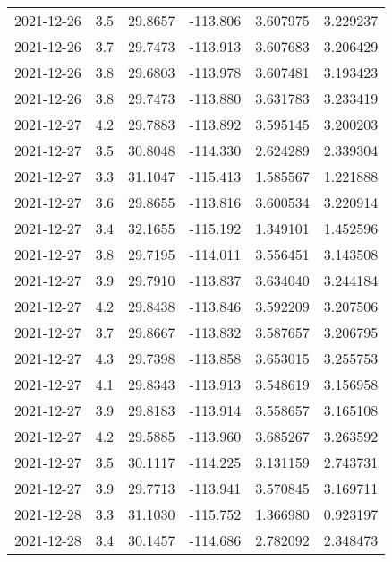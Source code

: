\begin{tabular}{lrrrrr}
2021-12-26 &       3.5 &  29.8657 &  -113.806 &         3.607975 &         3.229237 \\
2021-12-26 &       3.7 &  29.7473 &  -113.913 &         3.607683 &         3.206429 \\
2021-12-26 &       3.8 &  29.6803 &  -113.978 &         3.607481 &         3.193423 \\
2021-12-26 &       3.8 &  29.7473 &  -113.880 &         3.631783 &         3.233419 \\
2021-12-27 &       4.2 &  29.7883 &  -113.892 &         3.595145 &         3.200203 \\
2021-12-27 &       3.5 &  30.8048 &  -114.330 &         2.624289 &         2.339304 \\
2021-12-27 &       3.3 &  31.1047 &  -115.413 &         1.585567 &         1.221888 \\
2021-12-27 &       3.6 &  29.8655 &  -113.816 &         3.600534 &         3.220914 \\
2021-12-27 &       3.4 &  32.1655 &  -115.192 &         1.349101 &         1.452596 \\
2021-12-27 &       3.8 &  29.7195 &  -114.011 &         3.556451 &         3.143508 \\
2021-12-27 &       3.9 &  29.7910 &  -113.837 &         3.634040 &         3.244184 \\
2021-12-27 &       4.2 &  29.8438 &  -113.846 &         3.592209 &         3.207506 \\
2021-12-27 &       3.7 &  29.8667 &  -113.832 &         3.587657 &         3.206795 \\
2021-12-27 &       4.3 &  29.7398 &  -113.858 &         3.653015 &         3.255753 \\
2021-12-27 &       4.1 &  29.8343 &  -113.913 &         3.548619 &         3.156958 \\
2021-12-27 &       3.9 &  29.8183 &  -113.914 &         3.558657 &         3.165108 \\
2021-12-27 &       4.2 &  29.5885 &  -113.960 &         3.685267 &         3.263592 \\
2021-12-27 &       3.5 &  30.1117 &  -114.225 &         3.131159 &         2.743731 \\
2021-12-27 &       3.9 &  29.7713 &  -113.941 &         3.570845 &         3.169711 \\
2021-12-28 &       3.3 &  31.1030 &  -115.752 &         1.366980 &         0.923197 \\
2021-12-28 &       3.4 &  30.1457 &  -114.686 &         2.782092 &         2.348473 \\

\end{tabular}

